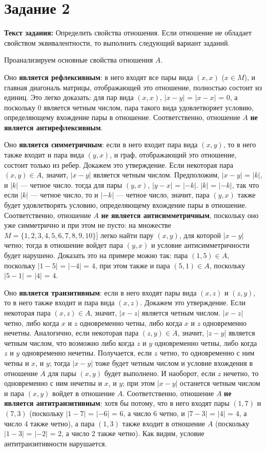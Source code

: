 \documentclass[12pt]{article}
\begin{document}
	\section{Задание 2}
	\label{task2}
	
	{\bf Текст задания:} Определить свойства отношения. Если отношение не обладает свойством эквивалентности, то выполнить следующий вариант заданий. 
	
	Проанализируем основные свойства отношения $A$. 
	
	Оно {\bf является рефлексивным}: в него входят все пары вида $(x, x)$ ($x \in M$), и главная диагональ матрицы, отображающей это отношение, полностью состоит из единиц. Это легко доказать: для пар вида $(x, x)$, $|x-y|$ = $|x-x|$ = 0, а поскольку 0 является четным числом, пара такого вида удовлетворяет условию, определяющему вхождение пары в отношение. Соответственно, отношение $A$ {\bf не является антирефлексивным}.
	
	Оно {\bf является симметричным}: если в него входит пара вида $(x, y)$, то в него также входит и пара вида $(y, x)$, и граф, отображающий это отношение, состоит только из ребер. Докажем это утверждение. Если некоторая пара $(x, y) \in A$, значит, $|x-y|$ является четным числом. Предположим, $|x-y|$ = $|k|$, и $|k|$ --- четное число. тогда для пары $(y, x)$, $|y-x|$ = $|-k|$. $|k|$ = $|-k|$, так что если $|k|$ --- четное число, то и $|-k|$ --- четное число, значит, пара $(y, x)$ также будет удовлетворять условию, определяющему вхождение пары в отношение. Соответственно, отношение $A$ {\bf не является антисимметричным}, поскольку оно уже симметрично и при этом не пусто: на множестве $M = \{1, 2, 3, 4, 5, 6, 7, 8, 9, 10\}]$ легко найти пару $(x, y)$, для которой $|x-y|$ четно; тогда в отношение войдет пара $(y, x)$ и условие антисимметричности будет нарушено. Доказать это на примере можно так: пара $(1, 5) \in A$, поскольку $|1-5|$ = $|-4|$ = $4$, при этом также и пара $(5, 1) \in A$, поскольку $|5-1|$ = $|4|$ = $4$.
	
	Оно {\bf является транзитивным}: если в него входят пары вида $(x, z)$ и $(z, y)$, то в него также входит и пара вида $(x, z)$. Докажем это утверждение. Если некоторая пара $(x, z) \in A$, значит, $|x-z|$ является четным числом. $|x-z|$ четно, либо когда $x$ и $z$ одновременно четны, либо когда $x$ и $z$ одновременно нечетны.  Аналогично, если некоторая пара $(z, y) \in A$, значит, $|z-y|$ является четным числом, что возможно либо когда $z$ и $y$ одновременно четны, либо когда $z$ и $y$ одновременно нечетны. Получается, если $z$ четно, то одновременно с ним четны и $x$, и $y$; тогда $|x-y|$ тоже будет четным числом и условие вхождения в отношение $A$ для пары $(x, y)$ будет выполнено. И наоборот, если $z$ нечетно, то одновременно с ним нечетны и $x$, и $y$; при этом $|x-y|$ останется четным числом и пара $(x, y)$ войдет в отношение $A$. Соответственно, отношение $A$ {\bf не является антитранзитивным}: хотя бы потому, что в него входят пары $(1, 7)$ и $(7, 3)$ (поскольку $|1-7|$ = $|-6|$ = $6$, а число 6 четно, и $|7-3|$ = $|4|$ = $4$, а число 4 также четно), а пара $(1, 3)$ также входит в отношение $A$ (поскольку $|1-3|$ = $|-2|$ = $2$, а число 2 также четно). Как видим, условие антитранзитивности нарушается.
	
\end{document}
